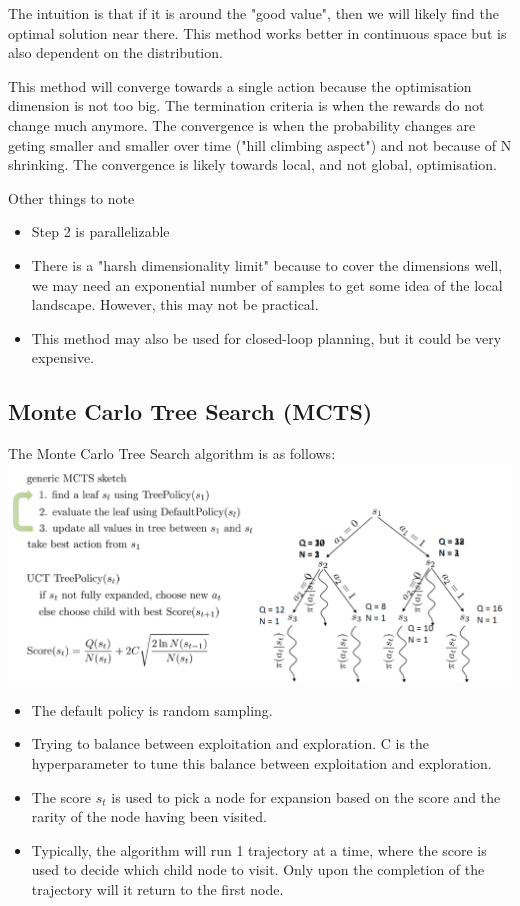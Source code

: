 \documentclass{article}
\begin{document}
The intuition is that if it is around the "good value", then we will likely find the optimal solution near there. This method works better in continuous space but is also dependent on the distribution.

This method will converge towards a single action because the optimisation dimension is not too big. The termination criteria is when the rewards do not change much anymore. The convergence is when the probability changes are geting smaller and smaller over time ("hill climbing aspect") and not because of N shrinking. The convergence is likely towards local, and not global, optimisation.

Other things to note
\begin{itemize}
    \item Step 2 is parallelizable
    \item There is a "harsh dimensionality limit" because to cover the dimensions well, we may need an exponential number of samples to get some idea of the local landscape. However, this may not be practical.
    \item This method may also be used for closed-loop planning, but it could be very expensive.
\end{itemize}


\subsection{Monte Carlo Tree Search (MCTS)}
The Monte Carlo Tree Search algorithm is as follows:
\includegraphics[scale=0.5]{MCTS.png}

\begin{itemize}
    \item The default policy is random sampling.
    
    \item Trying to balance between exploitation and exploration. C is the hyperparameter to tune this balance between exploitation and exploration.
    
    \item The score $s_t$ is used to pick a node for expansion based on the score and the rarity of the node having been visited.
    
    \item Typically, the algorithm will run 1 trajectory at a time, where the score is used to decide which child node to visit. Only upon the completion of the trajectory will it return to the first node.
    
\end{itemize}
\end{document}
